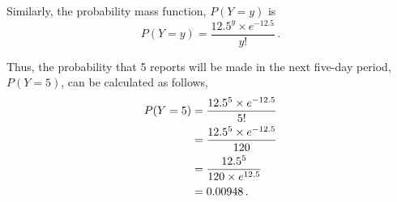 \begin{subquestions}
\begin{subsubquestions}
Similarly, the probability mass function, $P(Y=y)$ is
\begin{equation}
	P(Y=y) = \frac{12.5^y \times e^{-12.5}}{y!} \,.
\end{equation}

Thus, the probability that 5 reports will be made in the next five-day period, $P(Y=5)$, can be calculated as follows,
\begin{align}
	P(Y=5) & = \frac{12.5^5 \times e^{-12.5}}{5!} \nonumber \\
	       & = \frac{12.5^5 \times e^{-12.5}}{120} \nonumber \\
	       & = \frac{12.5^5}{120 \times e^{12.5}} \nonumber \\
	       & = 0.00948 \,.
\end{align}

\end{subsubquestions}
\end{subquestions}